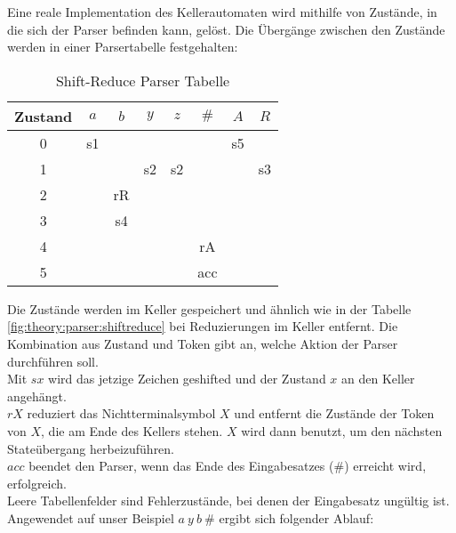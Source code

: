 Eine reale Implementation des Kellerautomaten wird mithilfe von Zustände, in die sich der Parser befinden kann, gelöst.
Die Übergänge zwischen den Zustände werden in einer Parsertabelle festgehalten:

\begin{table}[h]
\centering
\begin{tabular}{|c|c|c|c|c|c|c|c|}
Zustand & $a$ & $b$ & $y$ & $z$ & $\#$ & $A$ & $R$ \\\hline
0     & s1        &           &           &          &          & s5 &   \\
1     &           &           & s2        & s2       &          &   & s3 \\
2     &           & rR        &           &          &          &   &   \\
3     &           & s4        &           &          &          &   &   \\
4     &           &           &           &          & rA       &   &   \\
5     &           &           &           &          & acc      &   &   \\
\end{tabular}
\caption{Shift-Reduce Parser Tabelle}
\end{table}

Die Zustände werden im Keller gespeichert und ähnlich wie in der Tabelle \ref{fig:theory:parser:shiftreduce} bei Reduzierungen
im Keller entfernt.
Die Kombination aus Zustand und Token gibt an, welche Aktion der Parser durchführen soll.\\
Mit $sx$ wird das jetzige Zeichen geshifted und der Zustand $x$ an den Keller angehängt.\\
$rX$ reduziert das Nichtterminalsymbol $X$ und entfernt die Zustände der Token von $X$, die am Ende des Kellers stehen.
$X$ wird dann benutzt, um den nächsten Stateübergang herbeizuführen.\\
$acc$ beendet den Parser, wenn das Ende des Eingabesatzes ($\#$) erreicht wird, erfolgreich.\\
Leere Tabellenfelder sind Fehlerzustände, bei denen der Eingabesatz ungültig ist.\\

Angewendet auf unser Beispiel $a\ y\ b\ \#$ ergibt sich folgender Ablauf:

